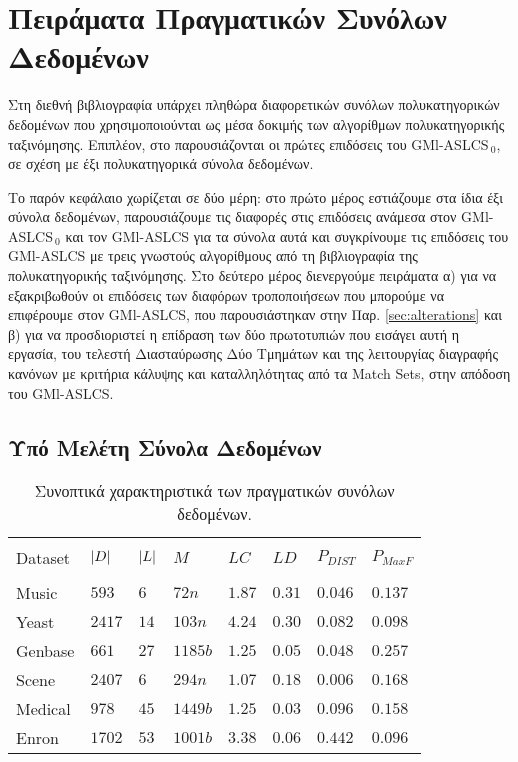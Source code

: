 \chapter{Πειράματα Πραγματικών Συνόλων Δεδομένων}
\label{realWorldDatasetsExps}
Στη διεθνή βιβλιογραφία υπάρχει πληθώρα διαφορετικών συνόλων πολυκατηγορικών δεδομένων που χρησιμοποιούνται ως μέσα δοκιμής των αλγορίθμων πολυκατηγορικής ταξινόμησης. Επιπλέον, στο \cite{allamanis11} παρουσιάζονται οι πρώτες επιδόσεις του GMl-ASLCS$_{\:0}$, σε σχέση με έξι πολυκατηγορικά σύνολα δεδομένων. 

Το παρόν κεφάλαιο χωρίζεται σε δύο μέρη: στο πρώτο μέρος εστιάζουμε στα ίδια έξι σύνολα δεδομένων, παρουσιάζουμε τις διαφορές στις επιδόσεις ανάμεσα στον GMl-ASLCS$_{\:0}$ και τον GMl-ASLCS για τα σύνολα αυτά και συγκρίνουμε τις επιδόσεις του GMl-ASLCS με τρεις γνωστούς αλγορίθμους από τη βιβλιογραφία της πολυκατηγορικής ταξινόμησης. Στο δεύτερο μέρος διενεργούμε πειράματα α) για να εξακριβωθούν οι επιδόσεις των διαφόρων τροποποιήσεων που μπορούμε να επιφέρουμε στον GMl-ASLCS, που παρουσιάστηκαν στην Παρ. \ref{sec:alterations} και β) για να προσδιοριστεί η επίδραση των δύο πρωτοτυπιών που εισάγει αυτή η εργασία, του τελεστή Διασταύρωσης Δύο Τμημάτων και της λειτουργίας διαγραφής κανόνων με κριτήρια κάλυψης και καταλληλότητας από τα Match Sets, στην απόδοση του GMl-ASLCS.


\section{Υπό Μελέτη Σύνολα Δεδομένων}

\begin{table}
\begin{center}
\caption{Συνοπτικά χαρακτηριστικά των πραγματικών συνόλων δεδομένων.}
\label{table:realDatasetsChar}
  \begin{tabular}{l|lllllll}
    \hline\\ [-2ex]
   Dataset	         & $\lvert D\rvert$  & $\lvert L\rvert$ & $M$   & $LC$ & $LD$ & $P_{DIST}$ & $P_{MaxF}$ \\
    \hline \\ [-2ex]
    Music   & $593$  & $6$        	& $72n$   & $1.87$ & $0.31$ & $0.046$      & $0.137$      \\
    Yeast   & $2417$ & $14$       	& $103n$  & $4.24$ & $0.30$ & $0.082$      & $0.098$      \\
    Genbase & $661$  & $27$        	& $1185b$ & $1.25$ & $0.05$ & $0.048$      & $0.257$      \\
    \hline
    Scene   & $2407$ & $6$         	& $294n$  & $1.07$ & $0.18$ & $0.006$      & $0.168$      \\
    Medical & $978$  & $45$        	& $1449b$ & $1.25$ & $0.03$ & $0.096$      & $0.158$      \\
    Enron   & $1702$ & $53$        	& $1001b$ & $3.38$ & $0.06$ & $0.442$      & $0.096$      \\
    \hline
  \end{tabular}
\end{center}
\end{table}


